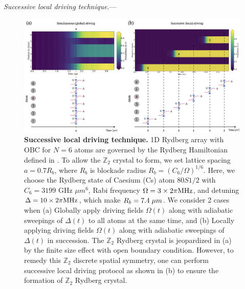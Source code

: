 \documentclass[%
 reprint,
nofootinbib,
 amsmath,amssymb,
 aps,
pra,
floatfix,
]{revtex4-2}
\begin{document}
\emph{Successive local driving technique.}--- 
\begin{figure}[ht!]
    \centering
    \includegraphics[width=14cm]{picture/successive_driving.png}
    \caption{\textbf{Successive local driving technique.} 1D Rydberg array with OBC for $N=6$ atoms are governed by the Rydberg Hamiltonian defined in \cite{Bernien2017ProbingSimulator}. To allow the $\mathbb{Z}_2$ crystal to form, we set lattice spacing $a = 0.7R_b$, where $R_b$ is blockade radius $R_b = (C_6/\Omega)^{1/6}$. Here, we choose the Rydberg state of Caesium (Cs) atom $80S1/2$ with $C_6 = 3199$ GHz $\mu m^6$, Rabi frequency $\Omega = 3 \times 2\pi \textit{\rm MHz}$, and detuning $\Delta = 10 \times 2\pi \textit{\rm MHz}$, which make $R_b=7.4 \hspace{1mm} \mu m$. We consider 2 cases when (a) Globally apply driving fields $\Omega(t)$ along with adiabatic sweepings of $\Delta(t)$ to all atoms at the same time, and (b) Locally applying driving fields $\Omega(t)$ along with adiabatic sweepings of $\Delta(t)$ in succession. The $\mathbb{Z}_2$ Rydberg crystal is jeopardized in (a) by the finite size effect with open boundary condition. However, to remedy this $\mathbb{Z}_2$ discrete spatial symmetry, one can perform successive local driving protocol as shown in (b) to ensure the formation of $\mathbb{Z}_2$ Rydberg crystal.}
    \label{fig:successinve_driving}
\end{figure}
\end{document}
